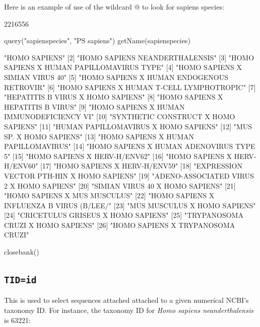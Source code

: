 \documentclass{article}
\begin{document}
Here is an example of use of the wildcard @ to look for sapiens species:

\begin{Schunk}
\begin{Soutput}
[1] 2216556
\end{Soutput}
\begin{Sinput}
 query("sapienspecies", "PS sapiens")
 getName(sapienspecies)
\end{Sinput}
\begin{Soutput}
 [1] "HOMO SAPIENS"                            
 [2] "HOMO SAPIENS NEANDERTHALENSIS"           
 [3] "HOMO SAPIENS X HUMAN PAPILLOMAVIRUS TYPE"
 [4] "HOMO SAPIENS X SIMIAN VIRUS 40"          
 [5] "HOMO SAPIENS X HUMAN ENDOGENOUS RETROVIR"
 [6] "HOMO SAPIENS X HUMAN T-CELL LYMPHOTROPIC"
 [7] "HEPATITIS B VIRUS X HOMO SAPIENS"        
 [8] "HOMO SAPIENS X HEPATITIS B VIRUS"        
 [9] "HOMO SAPIENS X HUMAN IMMUNODEFICIENCY VI"
[10] "SYNTHETIC CONSTRUCT X HOMO SAPIENS"      
[11] "HUMAN PAPILLOMAVIRUS X HOMO SAPIENS"     
[12] "MUS SP. X HOMO SAPIENS"                  
[13] "HOMO SAPIENS X HUMAN PAPILLOMAVIRUS"     
[14] "HOMO SAPIENS X HUMAN ADENOVIRUS TYPE 5"  
[15] "HOMO SAPIENS X HERV-H/ENV62"             
[16] "HOMO SAPIENS X HERV-H/ENV60"             
[17] "HOMO SAPIENS X HERV-H/ENV59"             
[18] "EXPRESSION VECTOR PTH-HIN X HOMO SAPIENS"
[19] "ADENO-ASSOCIATED VIRUS 2 X HOMO SAPIENS" 
[20] "SIMIAN VIRUS 40 X HOMO SAPIENS"          
[21] "HOMO SAPIENS X MUS MUSCULUS"             
[22] "HOMO SAPIENS X INFLUENZA B VIRUS (B/LEE/"
[23] "MUS MUSCULUS X HOMO SAPIENS"             
[24] "CRICETULUS GRISEUS X HOMO SAPIENS"       
[25] "TRYPANOSOMA CRUZI X HOMO SAPIENS"        
[26] "HOMO SAPIENS X TRYPANOSOMA CRUZI"        
\end{Soutput}
\begin{Sinput}
 closebank()
\end{Sinput}
\end{Schunk}

\subsection{\texttt{TID=id}}

This is used to select sequences attached attached to a given numerical 
NCBI's taxonomy ID. For instance, the taxonomy ID for 
\textit{Homo sapiens neanderthalensis} is 63221:
\end{document}

